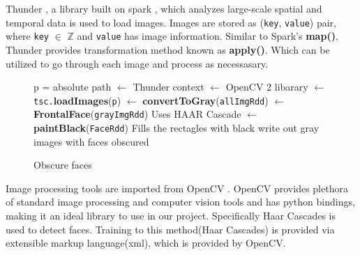 \documentclass[
	submission,
	final,
	notitlepage,
	narroweqnarray,
	inline,
	twoside,
	]{ieee}
\begin{document}
Thunder \cite{thunder}, a library built on spark \cite{spark}, which analyzes large-scale
spatial and temporal data is used to load images. Images are stored as ({\tt key}, {\tt value})
pair, where {\tt key} $\in$ $\mathbb{Z}$ and {\tt value} has image information. Similar to
Spark's {\bf map()}, Thunder provides transformation method known as {\bf apply()}. Which
can be utilized to go through each image and process as necessasary.\\
\begin{figure}[h!]
  \begin{algorithmic}[1]
     \Comment p = absolute path
		 $\gets$ Thunder context
		 $\gets$ OpenCV 2 libarary
		 $\gets$ {\tt tsc.}{\bf loadImages}({\tt p})
		 $\gets$ {\bf convertToGray}({\tt allImgRdd})
		 $\gets$ {\bf FrontalFace}({\tt grayImgRdd}) \Comment Uses HAAR Cascade
		 $\gets$ {\bf paintBlack}({\tt FaceRdd}) \Comment Fills the rectagles with black
		 \Comment write out gray images with faces obscured
    \EndFunction
  \end{algorithmic}
  \caption{Obscure faces}
\end{figure}
Image processing tools are imported from OpenCV \cite{opencv}. OpenCV provides plethora of standard
image processing and computer vision tools and has python bindings, making it an ideal
library to use in our project. Specifically Haar Cascades is used to detect faces. Training
to this method(Haar Cascades) is provided via extensible markup language(xml), which is provided
by OpenCV.
\end{document}

